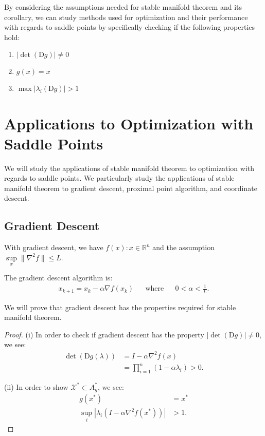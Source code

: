 \documentclass[twoside]{article}
\theoremstyle{definition}
\theoremstyle{definition}
\theoremstyle{remark}
\begin{document}
By considering the assumptions needed for stable manifold theorem and its corollary, we can study methods used for optimization and their performance with regards to saddle points by specifically checking if the following properties hold:

\begin{enumerate}
\item $|\det(\text{D}g)| \neq 0$
\item $g(x)=x$
\item $\max|\lambda_i (\text{D}g)| > 1$
\end{enumerate}

\section{Applications to Optimization with Saddle Points}

We will study the applications of stable manifold theorem to optimization with regards to saddle points. We particularly study the applications of stable manifold theorem to gradient descent, proximal point algorithm, and coordinate descent.

\subsection{Gradient Descent}

With gradient descent, we have $f(x) : x \in \mathbb{R}^{n}$ and the assumption $\sup \limits_x \| \nabla^2 f \| \leq L$.

The gradient descent algorithm is:
\[
\begin{aligned}
x_{k+1} = x_k - \alpha \nabla f(x_k) && \text{where} && 0 < \alpha < \frac{1}{L}.
\end{aligned}
\]

We will prove that gradient descent has the properties required for stable manifold theorem.

\begin{proof}

(i) In order to check if gradient descent has the property $|\det(\text{D}g)| \neq 0$, we see:
\[
\begin{aligned}
\det(\text{D}g(\lambda)) &= I - \alpha \nabla^2 f(x) \\
&= \prod \limits_{i=1}^n (1 - \alpha \lambda_i) > 0. 
\end{aligned}
\]

(ii) In order to show $\mathcal{X}^* \subset A_g^*$, we see:
\[
\begin{aligned}
g(x^*) &= x^* \\
\sup \limits_i | \lambda_i (I - \alpha \nabla^2 f(x^*)) | &> 1.
\end{aligned}
\]

\end{proof}
\end{document}
